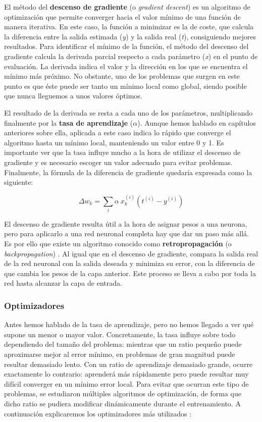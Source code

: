 El método del \textbf{descenso de gradiente} (o \textit{gradient descent}) \citep{Buduma:grad-dec} es un algoritmo de optimización que permite converger hacia el valor mínimo de una función de manera iterativa. En este caso, la función a minimizar es la de coste, que calcula la diferencia entre la salida estimada (\textit{y}) y la salida real (\textit{t}), consiguiendo mejores resultados. Para identificar el mínimo de la función, el método del descenso del gradiente calcula la derivada parcial respecto a cada parámetro (\textit{x}) en el punto de evaluación. La derivada indica el valor y la dirección en los que se encuentra el mínimo más próximo. No obstante, uno de los problemas que surgen en este punto es que éste puede ser tanto un mínimo local como global, siendo posible que nunca lleguemos a unos valores óptimos.

El resultado de la derivada se resta a cada uno de los parámetros, multiplicando finalmente por la \textbf{tasa de aprendizaje} ($\alpha$). Aunque hemos hablado en capítulos anteriores sobre ella, aplicada a este caso indica lo rápido que converge el algoritmo hasta un mínimo local, manteniendo un valor entre 0 y 1. Es importante ver que la tasa influye mucho a la hora de utilizar el descenso de gradiente y es necesario escoger un valor adecuado para evitar problemas. Finalmente, la fórmula de la diferencia de gradiente quedaría expresada como la siguiente:

$$\Delta w_{k} = \sum_{i} \alpha\ x_{k}^{(i)} (t^{(i)} - y^{(i)} )$$

El descenso de gradiente resulta útil a la hora de asignar pesos a una neurona, pero para aplicarlo a una red neuronal completa hay que dar un paso más allá. Es por ello que existe un algoritmo conocido como \textbf{retropropagación} (o \textit{backpropagation}) \citep{Buduma:backprop}. Al igual que en el descenso de gradiente, compara la salida real de la red neuronal con la salida deseada y minimiza su error, con la diferencia de que cambia los pesos de la capa anterior. Este proceso se lleva a cabo por toda la red hasta alcanzar la capa de entrada.

\subsubsection{Optimizadores}
Antes hemos hablado de la tasa de aprendizaje, pero no hemos llegado a ver qué supone un menor o mayor valor. Concretamente, la tasa influye sobre todo dependiendo del tamaño del problema: mientras que un ratio pequeño puede aproximarse mejor al error mínimo, en problemas de gran magnitud puede resultar demasiado lento. Con un ratio de aprendizaje demasiado grande, ocurre exactamente lo contrario: aprenderá más rápidamente pero puede resultar muy difícil converger en un mínimo error local. 
Para evitar que ocurran este tipo de problemas, se estudiaron múltiples algoritmos de optimización, de forma que dicho ratio se pudiera modificar dinámicamente durante el entrenamiento. A continuación explicaremos los optimizadores más utilizados \citep{NIPS2017_7003}:

